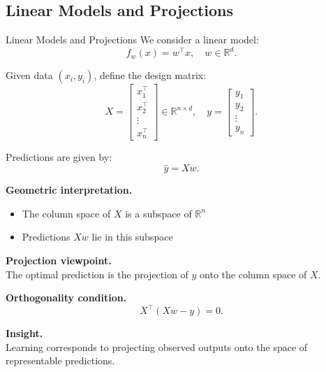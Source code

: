 \documentclass[aspectratio=169,11pt]{beamer}
\begin{document}
\subsection{Linear Models and Projections}
\begin{frame}[t,allowframebreaks]{Linear Models and Projections}
\small
We consider a linear model:
\[
f_w(x) = w^\top x, \quad w \in \mathbb{R}^d.
\]

Given data $(x_i, y_i)$, define the design matrix:
\[
X =
\begin{bmatrix}
x_1^\top \\
x_2^\top \\
\vdots \\
x_n^\top
\end{bmatrix}
\in \mathbb{R}^{n \times d}, \quad
y =
\begin{bmatrix}
y_1 \\
y_2 \\
\vdots \\
y_n
\end{bmatrix}.
\]

Predictions are given by:
\[
\hat{y} = Xw.
\]

\textbf{Geometric interpretation.}\\ \begin{itemize}
    \item The column space of $X$ is a subspace of $\mathbb{R}^n$
    \item Predictions $Xw$ lie in this subspace
\end{itemize}

\textbf{Projection viewpoint.}\\ The optimal prediction is the projection of $y$ onto the column space of $X$.

\textbf{Orthogonality condition.}\\ \[
X^\top (Xw - y) = 0.
\]

\textbf{Insight.}\\ Learning corresponds to projecting observed outputs onto the space of representable predictions.
\end{frame}
\end{document}
